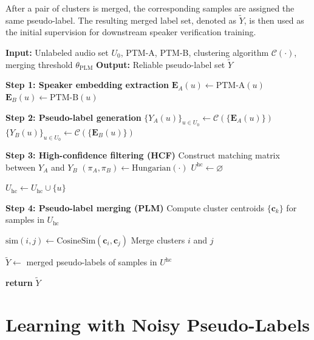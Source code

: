 \documentclass[lettersize,journal]{IEEEtran}
\begin{document}
After a pair of clusters is merged, the corresponding samples are
assigned the same pseudo-label. The resulting merged label set,
denoted as $\tilde{Y}$, is then used as the initial supervision for
downstream speaker verification training.
\begin{algorithm}[t]
\caption{\textbf{HCPL:} High-Confidence Pseudo-Label Generation Framework}
\label{alg:alg1}
\begin{algorithmic}
\STATE
\STATE \textbf{Input:} Unlabeled audio set $U_0$, PTM-A, PTM-B, clustering algorithm $\mathcal{C}(\cdot)$, merging threshold $\theta_{\mathrm{PLM}}$
\STATE \textbf{Output:} Reliable pseudo-label set $\tilde{Y}$

\STATE \textbf{Step 1: Speaker embedding extraction}
    \STATE $\mathbf{E}_A(u)\gets \mathrm{PTM\mbox{-}A}(u)$
    \STATE $\mathbf{E}_B(u)\gets \mathrm{PTM\mbox{-}B}(u)$
\ENDFOR

\STATE \textbf{Step 2: Pseudo-label generation}
\STATE $\{Y_A(u)\}_{u\in U_0}\gets \mathcal{C}(\{\mathbf{E}_A(u)\})$
\STATE $\{Y_B(u)\}_{u\in U_0}\gets \mathcal{C}(\{\mathbf{E}_B(u)\})$

\STATE \textbf{Step 3: High-confidence filtering (HCF)}
\STATE Construct matching matrix between $Y_A$ and $Y_B$
\STATE $(\pi_A,\pi_B)\gets \mathrm{Hungarian}(\cdot)$
\STATE $U^{\mathrm{hc}}\gets\varnothing$

        \STATE $U_{\mathrm{hc}}\gets U_{\mathrm{hc}}\cup\{u\}$
    \ENDIF
\ENDFOR

\STATE \textbf{Step 4: Pseudo-label merging (PLM)}
\STATE Compute cluster centroids $\{\mathbf{c}_k\}$ for samples in $U_{\mathrm{hc}}$

    \STATE $\mathrm{sim}(i,j)\gets \mathrm{CosineSim}(\mathbf{c}_i,\mathbf{c}_j)$
        \STATE Merge clusters $i$ and $j$
    \ENDIF
\ENDFOR

\STATE $\tilde{Y}\gets$ merged pseudo-labels of samples in $U^{\mathrm{hc}}$

\STATE \textbf{return} $\tilde{Y}$

\end{algorithmic}
\end{algorithm}
\section{Learning with Noisy Pseudo-Labels}
\end{document}
